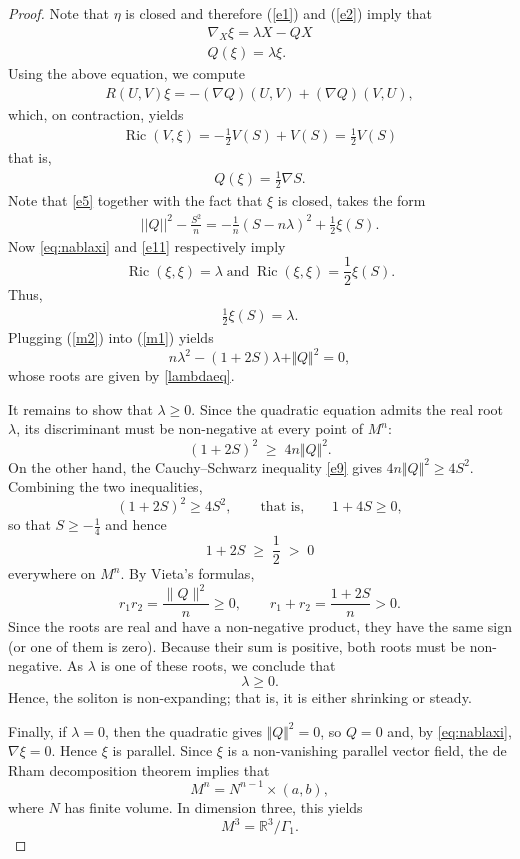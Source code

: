 \documentclass[10pt,a4paper]{amsart}
\begin{document}
\begin{proof}
Note that $\eta$ is closed and therefore (\ref{e1})
and (\ref{e2}) imply that
\begin{eqnarray}\label{eq:nablaxi}
\nabla_{X} \xi = \lambda X - Q X \\ \nonumber
Q(\xi) = \lambda \xi.
\end{eqnarray}
Using the above equation, we compute
\begin{eqnarray}\label{curv}
R(U,V)\xi = - (\nabla Q)(U,V) + (\nabla Q)(V,U),
\end{eqnarray}
which, on contraction, yields
\begin{eqnarray}\label{e11}
\operatorname{Ric}(V,\xi)  = -\frac{1}{2} V(S) + V(S) =  \frac{1}{2} V(S)
\end{eqnarray}
that is,
\begin{eqnarray}\label{Qxi}
Q(\xi) = \frac{1}{2} \nabla S.
\end{eqnarray}
Note that \eqref{e5} together with the fact that
$\xi$ is closed, takes the form
\begin{eqnarray}\label{m1}
||Q||^2 - \frac{S^2}{n}  =
- \frac{1}{n} \left(S - n \lambda \right)^2 + \frac{1}{2}
\xi(S).
\end{eqnarray}
Now \eqref{eq:nablaxi} and \eqref{e11} respectively imply
$$\operatorname{Ric}(\xi, \xi) = \lambda \;\mbox{and} \;
\operatorname{Ric}(\xi, \xi) = \frac{1}{2} \xi(S).$$
Thus,
\begin{eqnarray}\label{m2}
\frac{1}{2} \xi(S) = \lambda.
\end{eqnarray}
Plugging (\ref{m2}) into (\ref{m1}) yields
\[
n\lambda^{2}-(1+2S)\lambda+\Vert Q\Vert^{2}=0 ,
\]
whose roots are given by \eqref{lambdaeq}.

It remains to show that $\lambda\geq0$. Since the quadratic equation admits the real root $\lambda$,
its discriminant must be non-negative at every point of $M^n$:
\[
(1+2S)^{2}\;\geq\;4n\Vert Q\Vert^{2}.
\]
On the other hand, the Cauchy--Schwarz inequality \eqref{e9} gives
$4n\Vert Q\Vert^{2}\geq 4S^{2}$. Combining the two inequalities,
\[
(1+2S)^{2}\geq 4S^{2},
\qquad\text{that is,}\qquad
1+4S\geq0 ,
\]
so that $S\geq-\frac14$ and hence
\[
1+2S\;\geq\;\frac12\;>\;0
\]
everywhere on $M^{n}$. By Vieta's formulas,
\[
r_1r_2=\frac{\|Q\|^2}{n}\ge0,
\qquad
r_1+r_2=\frac{1+2S}{n}>0.
\]
Since the roots are real and have a non-negative product,
they have the same sign (or one of them is zero). Because
their sum is positive, both roots must be non-negative.
As $\lambda$ is one of these roots, we conclude that
\[
\lambda\ge0.
\]
Hence, the soliton is non-expanding; that is, it is either shrinking or steady.

Finally, if $\lambda=0$, then the quadratic gives
$\Vert Q\Vert^{2}=0$, so $Q=0$ and, by \eqref{eq:nablaxi}, $\nabla\xi=0$.
Hence $\xi$ is parallel. Since $\xi$ is a non-vanishing parallel vector
field, the de Rham decomposition theorem implies that
\[
M^n=N^{n-1}\times(a,b),
\]
where $N$ has finite volume. In dimension three, this yields
\[
M^3=\mathbb{R}^3/\Gamma_1 .
\]
\end{proof}
\end{document}
